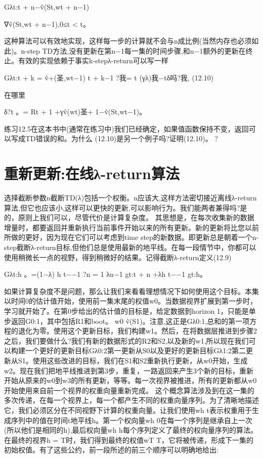 Gλt:t + n−v̂(St,wt + n−1)

∇v̂(St,wt + n−1),0≤t < t。

这种算法可以有效地实现，这样每一步的计算就不会与n成比例(当然内存也必须如此)。n-step TD方法,没有更新在第n−1每一集的时间步骤,和n−1额外的更新在终止。有效的实现依赖于事实k-stepλ-return可以写一样


Gλt:t + k = v̂+(圣,wt−1)
t + k−1 ?我= t
(γλ)我−tδ吗?我, 					(12.10)

在哪里

δ?t
。= Rt + 1 +γv̂(wt)圣+ 1−v̂(St,wt−1)。

练习12.5在这本书中(通常在练习中)我们已经确定，如果值函数保持不变，返回可以写成TD错误的和。为什么
(12.10)是另一个例子吗?证明(12.10)。 					?

\section{重新更新:在线λ-return算法}

选择截断参数n截断TD(λ)包括一个权衡。n应该大,这样方法密切接近离线λ-return算法,但它也应该小,这样可以更快的更新,可以影响行为。我们能两者兼得吗?是的，原则上我们可以，尽管代价是计算复杂度。
其思想是，在每次收集新的数据增量时，都要返回并重新执行当前事件开始以来的所有更新。新的更新将比您以前所做的更好，因为现在它们可以考虑到time step的新数据。即更新总是朝着一个n-step截断λ-return目标,但他们总是使用最新的地平线。在每一段情节中，你都可以使用稍微长一点的视野，得到稍微好的结果。记得截断λ-return定义(12.9)

Gλt:h
。=(1−λ)
h t−−1 ?n = 1
λn−1 gt:t + n +λh t−−1 gt:h。

如果计算复杂度不是问题，那么让我们来看看理想情况下如何使用这个目标。本集以时间0的估计值开始，使用前一集末尾的权值w0。当数据视界扩展到第一步时，学习就开始了。在第0步给出的估计值的目标是，给定数据到horizon 1，只能是单步返回G0:1，其中包括R1和boot。
w0 v̂(S1)。注意,这正是Gλ0:1,总和的第一项方程的退化为零。使用这个更新目标，我们构建w1。然后，在将数据层推进到步骤2之后，我们要做什么?我们有新的数据形式的R2和S2,以及新的w1,所以现在我们可以构建一个更好的更新目标Gλ0:2第一更新从S0以及更好的更新目标Gλ1:2第二更新从S1。使用这些改进的目标，我们在S1和S2重新执行更新，从w0开始，生成w2。现在我们把地平线推进到第3步，重复，一路返回来产生3个新的目标，重新开始从原来的w0到w3的所有更新，等等。每一次视界被推进，所有的更新都从w0开始使用来自前一个视界的权重向量重新完成。
这个概念算法涉及到在这一集的多次传递，在每一个视界上，每一个都产生不同的权重向量序列。为了清晰地描述它，我们必须区分在不同视野下计算的权重向量。让我们使用wh t表示权重用于生成序列中的值在时间t地平线h。第一个权向量wh 0在每一个序列是继承自上一次(所以他们是相同的h),最后权向量wh h每个序列定义了最终的权向量序列的算法。在最终的视界h = T时，我们得到最终的权值wT T，它将被传递，形成下一集的初始权值。有了这些公约，前一段所述的前三个顺序可以明确地给出:

